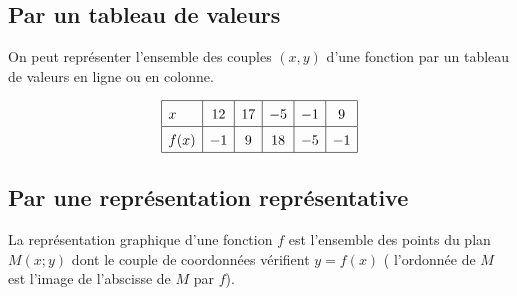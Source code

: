 \documentclass[main.tex]{subfiles}
\begin{document}
\subsection{Par un tableau de valeurs} 
On peut représenter l'ensemble des couples $(x,y)$ d'une fonction par un tableau de valeurs en ligne ou en colonne.
\begin{table}[h]
	$$\def\arraystretch{1.5}\begin{array}{|l|c|c|c|c|c|}
		\hline
		x & 12 & 17 & -5 & -1 & 9 \\
		\hline
		f(x) & -1 & 9 & 18 & -5 & -1 \\
		\hline
	\end{array}
	$$
	\caption{L'image de $-5$ par $f$ est $18$ : $f(-5)=18$}
\end{table}
\subsection{Par une représentation représentative} 
La représentation graphique d'une fonction $f$ est l'ensemble des points du plan $M(x;y)$ dont le couple de coordonnées vérifient $y=f(x)$  ( l'ordonnée de $M$ est l'image de l'abscisse de $M$ par $f$). 
\end{document}

